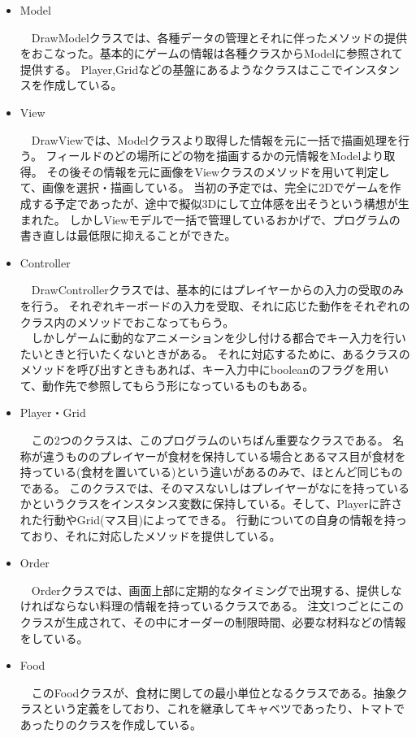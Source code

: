 \documentclass[a4j]{jsarticle} %
\begin{document}
\begin{itemize}
  \item Model\par
  　DrawModelクラスでは、各種データの管理とそれに伴ったメソッドの提供をおこなった。基本的にゲームの情報は各種クラスからModelに参照されて提供する。
  Player,Gridなどの基盤にあるようなクラスはここでインスタンスを作成している。
  \item View\par
  　DrawViewでは、Modelクラスより取得した情報を元に一括で描画処理を行う。
  フィールドのどの場所にどの物を描画するかの元情報をModelより取得。
  その後その情報を元に画像をViewクラスのメソッドを用いて判定して、画像を選択・描画している。
  当初の予定では、完全に2Dでゲームを作成する予定であったが、途中で擬似3Dにして立体感を出そうという構想が生まれた。
  しかしViewモデルで一括で管理しているおかげで、プログラムの書き直しは最低限に抑えることができた。
  \item Controller\par
  　DrawControllerクラスでは、基本的にはプレイヤーからの入力の受取のみを行う。
  それぞれキーボードの入力を受取、それに応じた動作をそれぞれのクラス内のメソッドでおこなってもらう。\\
  　しかしゲームに動的なアニメーションを少し付ける都合でキー入力を行いたいときと行いたくないときがある。
  それに対応するために、あるクラスのメソッドを呼び出すときもあれば、キー入力中にbooleanのフラグを用いて、動作先で参照してもらう形になっているものもある。
  \item Player・Grid\par
  　この2つのクラスは、このプログラムのいちばん重要なクラスである。
  名称が違うもののプレイヤーが食材を保持している場合とあるマス目が食材を持っている(食材を置いている)という違いがあるのみで、ほとんど同じものである。
  このクラスでは、そのマスないしはプレイヤーがなにを持っているかというクラスをインスタンス変数に保持している。そして、Playerに許された行動やGrid(マス目)によってできる。
  行動についての自身の情報を持っており、それに対応したメソッドを提供している。
  \item Order\par
  　Orderクラスでは、画面上部に定期的なタイミングで出現する、提供しなければならない料理の情報を持っているクラスである。
  注文1つごとにこのクラスが生成されて、その中にオーダーの制限時間、必要な材料などの情報をしている。
  \item Food\par
  　このFoodクラスが、食材に関しての最小単位となるクラスである。抽象クラスという定義をしており、これを継承してキャベツであったり、トマトであったりのクラスを作成している。

\end{itemize}
\end{document}
